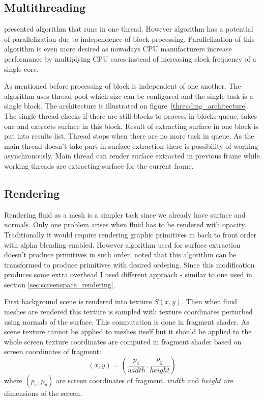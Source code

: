 \subsection{Multithreading}
\cite{RosenbergBirdwell2008} presented algorithm that runs in one thread. However algorithm has a potential of parallelization due to independence of block processing. Parallelization of this algorithm is even more desired as nowadays CPU manufacturers increase performance by multiplying CPU cores instead of increasing clock frequency of a single core. 

As mentioned before processing of block is independent of one another. The algorithm uses thread pool which size can be configured and the single task is a single block. The architecture is illustrated on figure~\ref{threading_architecture}. The single thread checks if there are still blocks to process in blocks queue, takes one and extracts surface in this block. Result of extracting surface in one block is put into results list. Thread stops when there are no more task in queue. As the main thread doesn't take part in surface extraction there is possibility of working asynchronously. Main thread can render surface extracted in previous frame while working threads are extracting surface for the current frame.


\subsection{Rendering}
Rendering fluid as a mesh is a simpler task since we already have surface and normals. Only one problem arises when fluid has to be rendered with opacity. Traditionally it would require rendering graphic primitives in back to front order with alpha blending enabled. However algorithm used for surface extraction doesn't produce primitives in such order.  \cite{RosenbergBirdwell2008} noted that this algorithm can be transformed to produce primitives with desired ordering. Since this modification produces some extra overhead I used different approach - similar to one used in section \ref{sec:screenspace_rendering}.

First background scene is rendered into texture $S(x, y)$. Then when fluid meshes are rendered this texture is sampled with texture coordinates perturbed using normals of the surface. This computation is done in fragment shader. As scene texture cannot be applied to meshes itself but it should be applied to the whole screen texture coordinates are computed in fragment shader based on screen coordinates of fragment:
\begin{equation}
(x, y) = (\frac{p_x}{width}, \frac{p_y}{height})
\end{equation}
where $(p_x, p_y)$ are screen coordinates of fragment, $width$ and $height$ are dimensions of the screen. 
